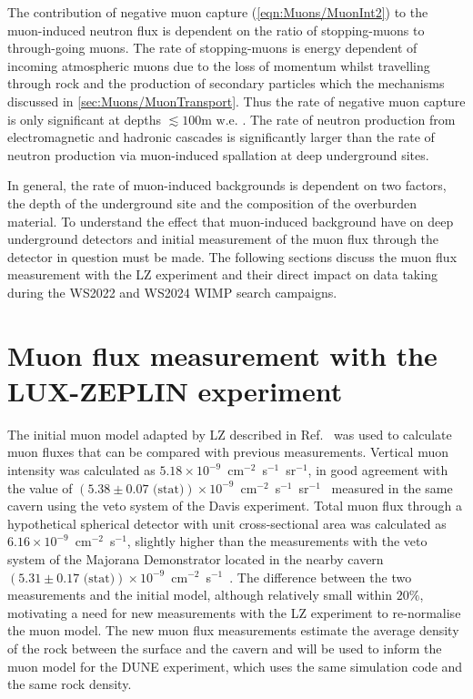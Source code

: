 The contribution of negative muon capture (\autoref{eqn:Muons/MuonInt2}) to the muon-induced neutron flux is dependent on the ratio of stopping-muons to through-going muons. The rate of stopping-muons is energy dependent of incoming atmospheric muons due to the loss of momentum whilst travelling through rock and the production of secondary particles which the mechanisms discussed in \autoref{sec:Muons/MuonTransport}. Thus the rate of negative muon capture is only significant at depths $\lesssim100\text{m w.e.}$ \cite{Gaisser_Engel_Resconi_2016}. The rate of neutron production from electromagnetic and hadronic cascades is significantly larger than the rate of neutron production via muon-induced spallation at deep underground sites.

In general, the rate of muon-induced backgrounds is dependent on two factors, the depth of the underground site and the composition of the overburden material. To understand the effect that muon-induced background have on deep underground detectors and initial measurement of the muon flux through the detector in question must be made. The following sections discuss the muon flux measurement with the LZ experiment and their direct impact on data taking during the WS2022 and WS2024 WIMP search campaigns.  

\section{Muon flux measurement with the LUX-ZEPLIN experiment}\label{sec:Muons/MuonFluxMeasurementWithLZ}
The initial muon model adapted by LZ described in Ref.~\cite{LZ_SIMS} was used to calculate muon fluxes that can be compared with previous measurements. Vertical muon intensity was calculated as $5.18\times10^{-9}$~cm$^{-2}$~s$^{-1}$~sr$^{-1}$, in good agreement with the value of $(5.38\pm0.07\text{ (stat)})\times10^{-9}$~cm$^{-2}$~s$^{-1}$~sr$^{-1}$~\cite{Cherry} measured in the same cavern using the veto system of the Davis experiment. Total muon flux through a hypothetical spherical detector with unit cross-sectional area was calculated as $6.16\times10^{-9}$~cm$^{-2}$~s$^{-1}$, slightly higher than the measurements with the veto system of the Majorana Demonstrator located in the nearby cavern $(5.31\pm0.17 \text{ (stat)})\times10^{-9}$~cm$^{-2}$~s$^{-1}$~\cite{majorana}.
The difference between the two measurements and the initial model, although relatively small within $20\%$, motivating a need for new measurements with the LZ experiment to re-normalise the muon model. The new muon flux measurements estimate the average density of the rock between the surface and the cavern and will be used to inform the muon model for the DUNE experiment\cite{DUNE}, which uses the same simulation code and the same rock density.

